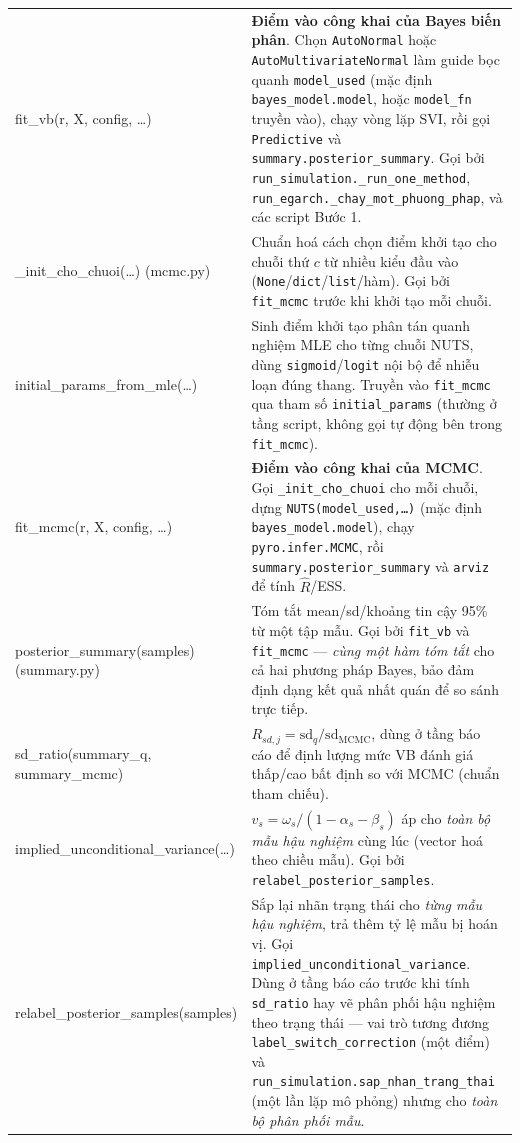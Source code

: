 \documentclass[11pt,a4paper]{article}
\newcommand{\code}[1]{\texttt{#1}}
\begin{document}
\begin{longtable}{@{}>{\ttfamily\scriptsize\raggedright\arraybackslash}p{5.0cm} >{\raggedright\arraybackslash}p{9.5cm}@{}}
fit\_vb(r, X, config, \ldots) & \textbf{Điểm vào công khai của Bayes biến phân}. Chọn \code{AutoNormal} hoặc \code{AutoMultivariateNormal} làm guide bọc quanh \code{model\_used} (mặc định \code{bayes\_model.model}, hoặc \code{model\_fn} truyền vào), chạy vòng lặp SVI, rồi gọi \code{Predictive} và \code{summary.posterior\_summary}. Gọi bởi \code{run\_simulation.\_run\_one\_method}, \code{run\_egarch.\_chay\_mot\_phuong\_phap}, và các script Bước 1. \\
\_init\_cho\_chuoi(\ldots) \newline \footnotesize{(mcmc.py)} & Chuẩn hoá cách chọn điểm khởi tạo cho chuỗi thứ $c$ từ nhiều kiểu đầu vào (\code{None}/\code{dict}/\code{list}/hàm). Gọi bởi \code{fit\_mcmc} trước khi khởi tạo mỗi chuỗi. \\
initial\_params\_from\_mle(\ldots) & Sinh điểm khởi tạo phân tán quanh nghiệm MLE cho từng chuỗi NUTS, dùng \code{sigmoid}/\code{logit} nội bộ để nhiễu loạn đúng thang. Truyền vào \code{fit\_mcmc} qua tham số \code{initial\_params} (thường ở tầng script, không gọi tự động bên trong \code{fit\_mcmc}). \\
fit\_mcmc(r, X, config, \ldots) & \textbf{Điểm vào công khai của MCMC}. Gọi \code{\_init\_cho\_chuoi} cho mỗi chuỗi, dựng \code{NUTS(model\_used,\ldots)} (mặc định \code{bayes\_model.model}), chạy \code{pyro.infer.MCMC}, rồi \code{summary.posterior\_summary} và \code{arviz} để tính $\hat R$/ESS. \\
posterior\_summary(samples) \newline \footnotesize{(summary.py)} & Tóm tắt mean/sd/khoảng tin cậy 95\% từ một tập mẫu. Gọi bởi \code{fit\_vb} và \code{fit\_mcmc} --- \emph{cùng một hàm tóm tắt} cho cả hai phương pháp Bayes, bảo đảm định dạng kết quả nhất quán để so sánh trực tiếp. \\
sd\_ratio(summary\_q, summary\_mcmc) & $R_{sd,j}=\mathrm{sd}_q/\mathrm{sd}_{\text{MCMC}}$, dùng ở tầng báo cáo để định lượng mức VB đánh giá thấp/cao bất định so với MCMC (chuẩn tham chiếu). \\
implied\_unconditional\_variance(\ldots) & $v_s=\omega_s/(1-\alpha_s-\beta_s)$ áp cho \emph{toàn bộ mẫu hậu nghiệm} cùng lúc (vector hoá theo chiều mẫu). Gọi bởi \code{relabel\_posterior\_samples}. \\
relabel\_posterior\_samples(samples) & Sắp lại nhãn trạng thái cho \emph{từng mẫu hậu nghiệm}, trả thêm tỷ lệ mẫu bị hoán vị. Gọi \code{implied\_unconditional\_variance}. Dùng ở tầng báo cáo trước khi tính \code{sd\_ratio} hay vẽ phân phối hậu nghiệm theo trạng thái --- vai trò tương đương \code{label\_switch\_correction} (một điểm) và \code{run\_simulation.sap\_nhan\_trang\_thai} (một lần lặp mô phỏng) nhưng cho \emph{toàn bộ phân phối mẫu}. \\

\end{longtable}
\end{document}
